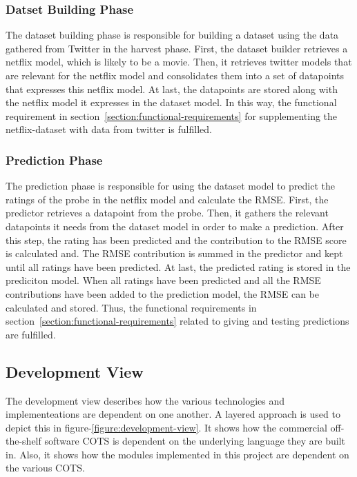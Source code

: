 \subsubsection{Datset Building Phase}
The dataset building phase is responsible for building a dataset using the data gathered from Twitter in the harvest phase. First, the dataset builder retrieves a netflix model, which is likely to be a movie. Then, it retrieves twitter models that are relevant for the netflix model and consolidates them into a set of datapoints that expresses this netflix model. At last, the datapoints are stored along with the netflix model it expresses in the dataset model. In this way, the functional requirement in section~\ref{section:functional-requirements} for supplementing the netflix-dataset with data from twitter is fulfilled.

\subsubsection{Prediction Phase}\label{subsubsec:predict-phase}
The prediction phase is responsible for using the dataset model to predict the ratings of the probe in the netflix model and calculate the RMSE. First, the predictor retrieves a datapoint from the probe. Then, it gathers the relevant datapoints it needs from the dataset model in order to make a prediction. After this step, the rating has been predicted and the contribution to the RMSE score is calculated and. The RMSE contribution is summed in the predictor and kept until all ratings have been predicted. At last, the predicted rating is stored in the prediciton model. When all ratings have been predicted and all the RMSE contributions have been added to the prediction model, the RMSE can be calculated and stored. Thus, the functional requirements in section~\ref{section:functional-requirements} related to giving and testing predictions are fulfilled.

\subsection{Development View}
The development view describes how the various technologies and implementeations are dependent on one another. A layered approach is used to depict this in figure-\ref{figure:development-view}. It shows how the commercial off-the-shelf software COTS is dependent on the underlying language they are built in. Also, it shows how the modules implemented in this project are dependent on the various COTS.

